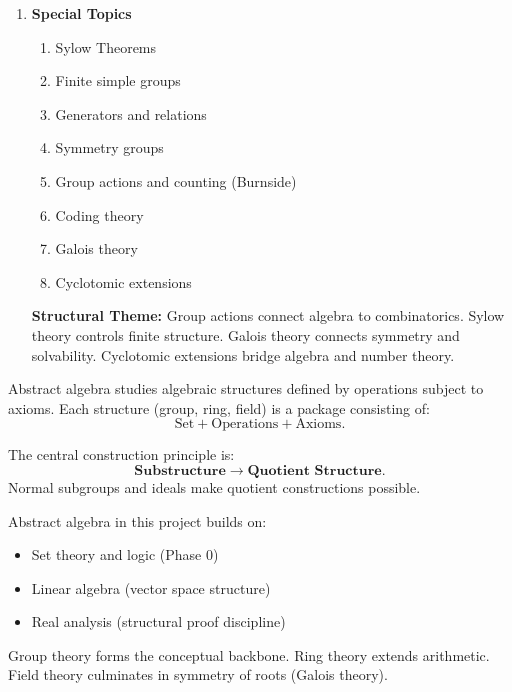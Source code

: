 \begin{enumerate}

\item \textbf{Special Topics}

\begin{enumerate}
    \item Sylow Theorems
    \item Finite simple groups
    \item Generators and relations
    \item Symmetry groups
    \item Group actions and counting (Burnside)
    \item Coding theory
    \item Galois theory
    \item Cyclotomic extensions
\end{enumerate}

\vspace{0.5em}
\textbf{Structural Theme:}
Group actions connect algebra to combinatorics.
Sylow theory controls finite structure.
Galois theory connects symmetry and solvability.
Cyclotomic extensions bridge algebra and number theory.

\end{enumerate}


\vspace{1em}

\begin{remark}
Abstract algebra studies algebraic structures defined by operations
subject to axioms. Each structure (group, ring, field) is a
package consisting of:
\[
\text{Set} + \text{Operations} + \text{Axioms}.
\]
\end{remark}

\begin{remark}
The central construction principle is:
\[
\textbf{Substructure} \longrightarrow \textbf{Quotient Structure}.
\]
Normal subgroups and ideals make quotient constructions possible.
\end{remark}

\begin{remark}
Abstract algebra in this project builds on:

\begin{itemize}
    \item Set theory and logic (Phase 0)
    \item Linear algebra (vector space structure)
    \item Real analysis (structural proof discipline)
\end{itemize}

Group theory forms the conceptual backbone.
Ring theory extends arithmetic.
Field theory culminates in symmetry of roots (Galois theory).
\end{remark}

